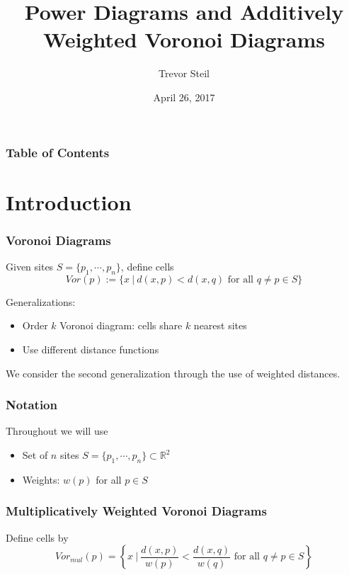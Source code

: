 \documentclass{beamer}
\title{Power Diagrams and Additively Weighted Voronoi Diagrams}
\institute{University of Minnesota}
\date{April 26, 2017}
\author{Trevor Steil}
\newcommand{\R}{\mathbb{R}}
\begin{document}
\begin{frame}
  \titlepage
\end{frame}

\begin{frame}
  \frametitle{Table of Contents}
  \tableofcontents
\end{frame}

\section{Introduction}
\begin{frame}
  \frametitle{Voronoi Diagrams}

  Given sites $S = \{ p_1, \cdots, p_n \}$, define cells
  \[ Vor(p) := \{ x \ | \ d(x,p) < d(x,q) \text{ for all } q \neq p \in S \} \]

  Generalizations:
  \begin{itemize}
    \item Order $k$ Voronoi diagram: cells share $k$ nearest sites
    \item Use different distance functions
  \end{itemize}

  We consider the second generalization through the use of weighted distances.
\end{frame}

\begin{frame}
  \frametitle{Notation}

  Throughout we will use
  \begin{itemize}
    \item Set of $n$ sites $S = \{p_1,\cdots, p_n\} \subset \R^2$
    \item Weights: $w(p)$ for all $p \in S$
  \end{itemize}

\end{frame}

\begin{frame}
  \frametitle{Multiplicatively Weighted Voronoi Diagrams}

  Define cells by
  \[ Vor_{mul}(p) = \left \{ x \ \big| \ \frac{d(x,p)}{w(p)} < \frac{d(x,q)}{w(q)} \text{ for all } q \neq p \in S \right \} \]


\end{frame}
\end{document}
